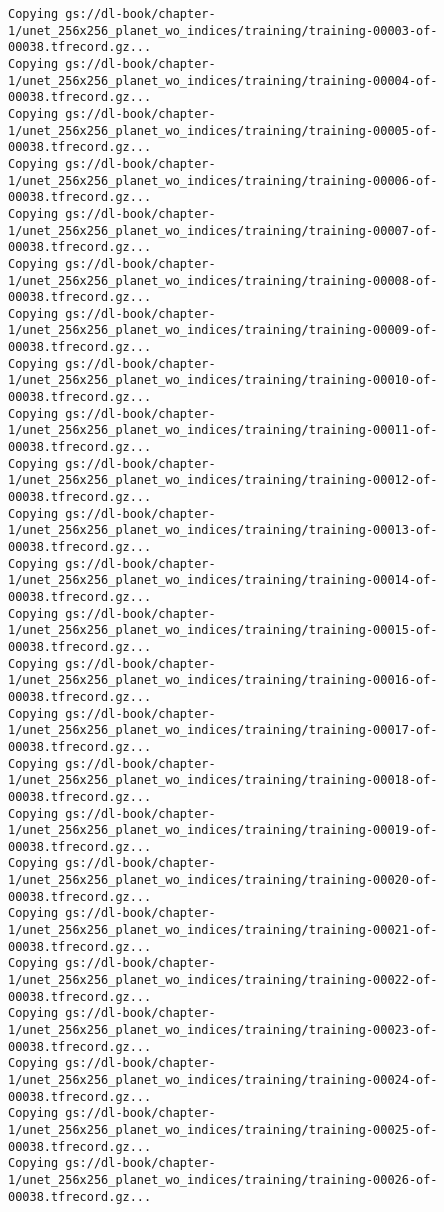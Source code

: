 \documentclass[
  letterpaper,
  DIV=11,
  numbers=noendperiod]{scrreprt}
\begin{document}
\begin{verbatim}
Copying gs://dl-book/chapter-1/unet_256x256_planet_wo_indices/training/training-00003-of-00038.tfrecord.gz...
Copying gs://dl-book/chapter-1/unet_256x256_planet_wo_indices/training/training-00004-of-00038.tfrecord.gz...
Copying gs://dl-book/chapter-1/unet_256x256_planet_wo_indices/training/training-00005-of-00038.tfrecord.gz...
Copying gs://dl-book/chapter-1/unet_256x256_planet_wo_indices/training/training-00006-of-00038.tfrecord.gz...
Copying gs://dl-book/chapter-1/unet_256x256_planet_wo_indices/training/training-00007-of-00038.tfrecord.gz...
Copying gs://dl-book/chapter-1/unet_256x256_planet_wo_indices/training/training-00008-of-00038.tfrecord.gz...
Copying gs://dl-book/chapter-1/unet_256x256_planet_wo_indices/training/training-00009-of-00038.tfrecord.gz...
Copying gs://dl-book/chapter-1/unet_256x256_planet_wo_indices/training/training-00010-of-00038.tfrecord.gz...
Copying gs://dl-book/chapter-1/unet_256x256_planet_wo_indices/training/training-00011-of-00038.tfrecord.gz...
Copying gs://dl-book/chapter-1/unet_256x256_planet_wo_indices/training/training-00012-of-00038.tfrecord.gz...
Copying gs://dl-book/chapter-1/unet_256x256_planet_wo_indices/training/training-00013-of-00038.tfrecord.gz...
Copying gs://dl-book/chapter-1/unet_256x256_planet_wo_indices/training/training-00014-of-00038.tfrecord.gz...
Copying gs://dl-book/chapter-1/unet_256x256_planet_wo_indices/training/training-00015-of-00038.tfrecord.gz...
Copying gs://dl-book/chapter-1/unet_256x256_planet_wo_indices/training/training-00016-of-00038.tfrecord.gz...
Copying gs://dl-book/chapter-1/unet_256x256_planet_wo_indices/training/training-00017-of-00038.tfrecord.gz...
Copying gs://dl-book/chapter-1/unet_256x256_planet_wo_indices/training/training-00018-of-00038.tfrecord.gz...
Copying gs://dl-book/chapter-1/unet_256x256_planet_wo_indices/training/training-00019-of-00038.tfrecord.gz...
Copying gs://dl-book/chapter-1/unet_256x256_planet_wo_indices/training/training-00020-of-00038.tfrecord.gz...
Copying gs://dl-book/chapter-1/unet_256x256_planet_wo_indices/training/training-00021-of-00038.tfrecord.gz...
Copying gs://dl-book/chapter-1/unet_256x256_planet_wo_indices/training/training-00022-of-00038.tfrecord.gz...
Copying gs://dl-book/chapter-1/unet_256x256_planet_wo_indices/training/training-00023-of-00038.tfrecord.gz...
Copying gs://dl-book/chapter-1/unet_256x256_planet_wo_indices/training/training-00024-of-00038.tfrecord.gz...
Copying gs://dl-book/chapter-1/unet_256x256_planet_wo_indices/training/training-00025-of-00038.tfrecord.gz...
Copying gs://dl-book/chapter-1/unet_256x256_planet_wo_indices/training/training-00026-of-00038.tfrecord.gz...

\end{verbatim}
\end{document}
